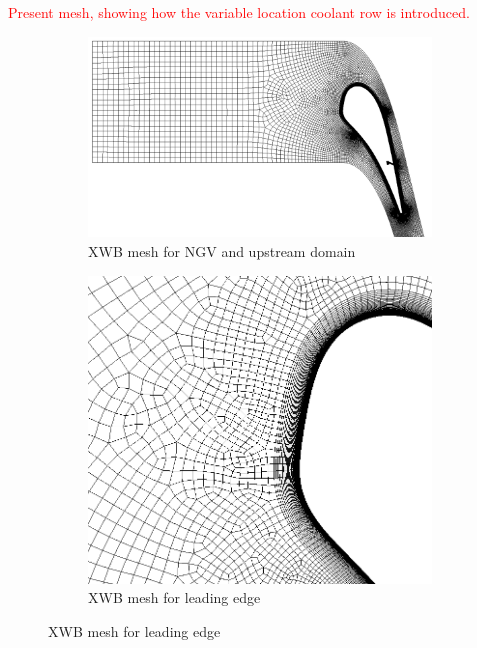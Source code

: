 \documentclass[a4paper, 11pt, oneside]{report}
\begin{document}
\textcolor{red}{Present mesh, showing how the variable location coolant row is introduced.}
\begin{figure}[H]
  \centering
  \begin{subfigure}{.9\textwidth}
    \centering
    \includegraphics[width=\linewidth]{figs/SCH_mesh_domain_placeholder.png}
    \caption{XWB mesh for NGV and upstream domain}
    \label{fig:SCH_mesh_1}
  \end{subfigure}
  \vspace{0.05\textwidth}
  \begin{subfigure}{.45\textwidth}
    \centering
    \includegraphics[width=\linewidth]{figs/SCH_mesh_leading_edge_placeholder.png}
    \caption{XWB mesh for leading edge}
    \label{fig:SCH_mesh_2}

\end{subfigure}
\end{figure}
\end{document}
